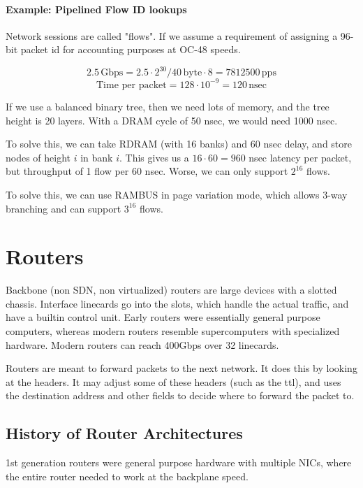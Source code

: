 \documentclass{idc_msc}
\begin{document}
\paragraph{Example: Pipelined Flow ID lookups}

Network sessions are called "flows".
If we assume a requirement of assigning a 96-bit packet id for accounting purposes at OC-48 speeds.

\[
  2.5\, \textrm{Gbps} = 2.5 \cdot 2^{30} / 40\,\textrm{byte} \cdot 8 = 7812500\,\textrm{pps}
\]
\[
  \text{Time per packet} = 128 \cdot 10^{-9} = 120\,\textrm{nsec}
\]

If we use a balanced binary tree, then we need lots of memory, and the tree height is 20 layers.
With a DRAM cycle of 50 nsec, we would need 1000 nsec.

To solve this, we can take RDRAM (with 16 banks) and 60 nsec delay, and store nodes of height \(i\) in bank \(i\).
This gives us a \(16 \cdot 60=960\) nsec latency per packet, but throughput of 1 flow per 60 nsec.
Worse, we can only support \(2^{16}\) flows.

To solve this, we can use RAMBUS in page variation mode, which allows 3-way branching and can support \(3^{16}\) flows.

\section{Routers}

Backbone (non SDN, non virtualized) routers are large devices with a slotted chassis.
Interface linecards go into the slots, which handle the actual traffic, and have a builtin control unit.
Early routers were essentially general purpose computers, whereas modern routers resemble supercomputers with specialized hardware.
Modern routers can reach 400Gbps over 32 linecards.

Routers are meant to forward packets to the next network.
It does this by looking at the headers. It may adjust some of these headers (such as the ttl), and uses the destination address and other fields to decide where to forward the packet to.

\subsection{History of Router Architectures}

1st generation routers were general purpose hardware with multiple NICs, where the entire router needed to work at the backplane speed.
\end{document}

